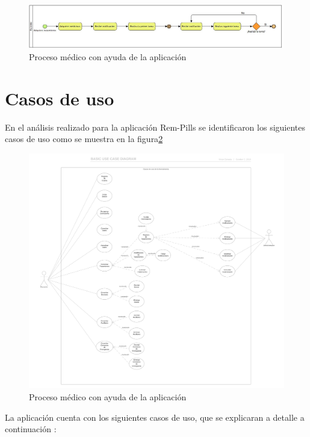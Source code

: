 \begin{figure}[htb]
	\centering
	\includegraphics[width=1.1\textwidth]{images/cap2/AdquiereTratamientoP2}
	\caption{Proceso médico con ayuda de la aplicación} \label{fig:subproceso2}
\end{figure}


\section{Casos de uso}
En el análisis realizado para la aplicación Rem-Pills se identificaron los siguientes casos de uso como se muestra en la figura\ref{fig:casosdeuso}
\begin{figure}[htb]
	\centering
	\includegraphics[width=1.1\textwidth]{images/cap2/casosdeuso}
	\caption{Proceso médico con ayuda de la aplicación} \label{fig:casosdeuso}
\end{figure} 
La aplicación cuenta con los siguientes casos de uso, que se explicaran a detalle a continuación :
